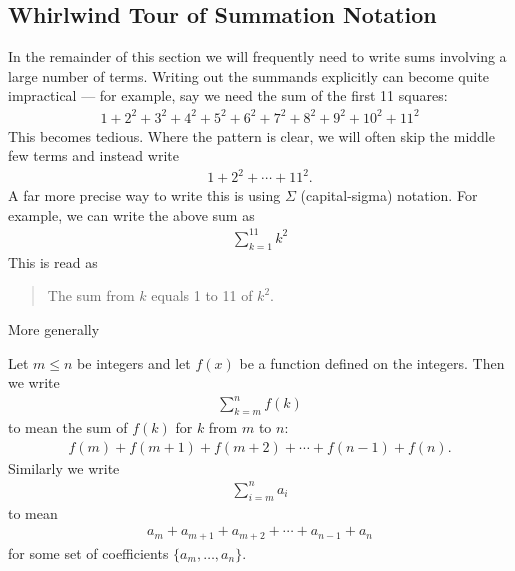 \subsection*{Whirlwind Tour of Summation Notation}
In the remainder of this section we will frequently need to write sums involving a
large number of terms. Writing out the summands explicitly can become quite
impractical --- for example, say we need the sum of the first 11 squares:
\begin{align*}
  1 + 2^2 + 3^2 + 4^2+ 5^2 + 6^2 + 7^2 + 8^2 + 9^2 + 10^2 + 11^2
\end{align*}
This becomes tedious. Where the pattern is clear, we will often skip the middle few
terms and instead write
\begin{align*}
  1 + 2^2 + \cdots  + 11^2.
\end{align*}
A far more precise way to write this is using $\Sigma$ (capital-sigma) notation. For
example, we can write the above sum as
\begin{align*}
  \sum_{k=1}^{11} k^2
\end{align*}
This is read as
\begin{quote}
 The sum from $k$ equals 1 to 11 of $k^2$.
\end{quote}
More generally
\begin{notn}
Let $m\leq n$ be integers and let $f(x)$ be a function defined on the integers.
Then we write
\begin{align*}
  \sum_{k=m}^n f(k)
\end{align*}
to mean the sum of $f(k)$ for $k$ from $m$ to $n$:
\begin{align*}
  f(m) + f(m+1) + f(m+2) + \cdots + f(n-1) + f(n).
\end{align*}
Similarly we write
\begin{align*}
  \sum_{i=m}^n a_i
\end{align*}
to mean
\begin{align*}
  a_m+a_{m+1}+a_{m+2}+\cdots+a_{n-1}+a_n
\end{align*}
for some set of coefficients $\{ a_m, \ldots, a_n \}$.
\end{notn}


